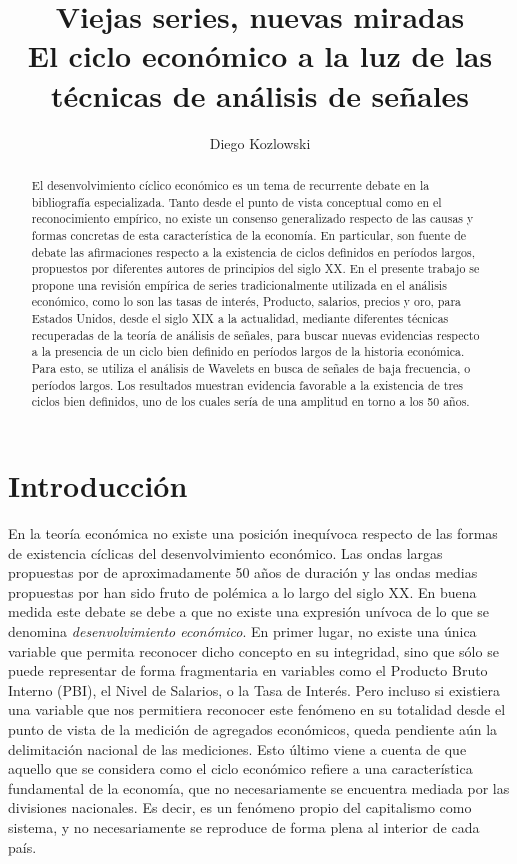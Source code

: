 \documentclass[a4paper]{article}
\title{Viejas series, nuevas miradas \\ {\large El ciclo económico a la luz de las técnicas de análisis de señales} }
\author[1]{Diego Kozlowski}
\affil[1]{Maestr\'ia en Data Mining \& Knowledge Discovery, FCEN-UBA \\ diegokoz92@gmail.com}
\date{}                     %
\begin{document}
\maketitle

\begin{abstract}
	
	El desenvolvimiento cíclico económico es un tema de recurrente debate en la bibliografía especializada. Tanto desde el punto de vista conceptual como en el reconocimiento empírico, no existe un consenso generalizado respecto de las causas y formas concretas de esta característica de la economía. En particular, son fuente de debate las afirmaciones respecto a la existencia de ciclos definidos en períodos largos, propuestos por diferentes autores de principios del siglo XX. En el presente trabajo se propone una revisión empírica de series tradicionalmente utilizada en el análisis económico, como lo son las tasas de interés, Producto, salarios, precios y oro, para Estados Unidos, desde el siglo XIX a la actualidad, mediante diferentes técnicas recuperadas de la teoría de análisis de señales, para buscar nuevas evidencias respecto a la presencia de un ciclo bien definido en períodos largos de la historia económica. Para esto, se utiliza el análisis de Wavelets en busca de señales de baja frecuencia, o períodos largos. Los resultados muestran evidencia favorable a la existencia de tres ciclos bien definidos, uno de los cuales sería de una amplitud en torno a los 50 años.
\end{abstract}

\section{Introducción}

En la teoría económica no existe una posición inequívoca respecto de las formas de existencia cíclicas del desenvolvimiento económico. Las ondas largas propuestas por \cite{kondratieff1979long} de aproximadamente 50 años de duración y las ondas medias propuestas por \cite{kuznets1930secular} han sido fruto de polémica a lo largo del siglo XX. En buena medida este debate se debe a que no existe una expresión unívoca de lo que se denomina \textit{desenvolvimiento económico}. En primer lugar, no existe una única variable que permita reconocer dicho concepto en su integridad, sino que sólo se puede representar de forma fragmentaria en variables como el Producto Bruto Interno (PBI), el Nivel de Salarios, o la Tasa de Interés. Pero incluso si existiera una variable que nos permitiera reconocer este fenómeno en su totalidad desde el punto de vista de la medición de agregados económicos, queda pendiente aún la delimitación nacional de las mediciones. Esto último viene a cuenta de que aquello que se considera como el ciclo económico refiere a una característica fundamental de la economía, que no necesariamente se encuentra mediada por las divisiones nacionales. Es decir, es un fenómeno propio del capitalismo como sistema, y no necesariamente se reproduce de forma plena al interior de cada país. 
\end{document}
